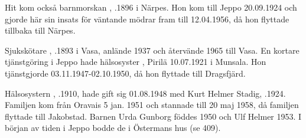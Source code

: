 Hit kom också barnmorskan , .1896 i Närpes. Hon kom till Jeppo 20.09.1924 och gjorde här sin insats för väntande mödrar fram till 12.04.1956, då hon flyttade tillbaka till Närpes.

Sjukskötare , .1893 i Vasa, anlände 1937 och återvände 1965 till Vasa. En kortare tjänstgöring i Jeppo hade hälsosyster , \textborn Pirilä 10.07.1921 i Munsala. Hon tjänstgjorde 03.11.1947-02.10.1950, då hon flyttade till Dragsfjärd.

Hälsosystern , .1910, hade gift sig 01.08.1948 med Kurt Helmer Stadig, .1924. Familjen kom  från Oravais 5 jan. 1951 och stannade till 20 maj 1958, då familjen flyttade till Jakobstad. Barnen Urda Gunborg föddes 1950 och Ulf Helmer 1953. I början av tiden i Jeppo bodde de i Östermans hus (se 409).
